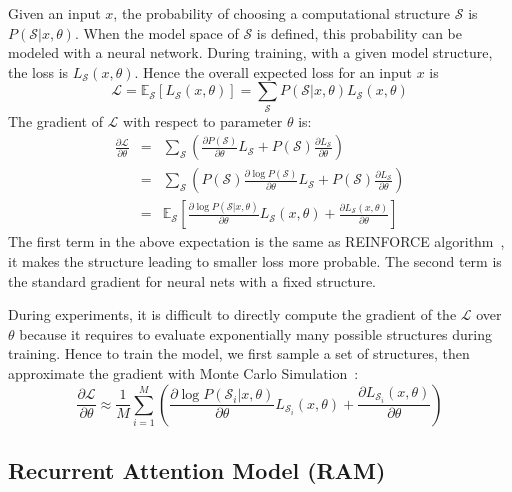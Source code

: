 \documentclass[10pt,twocolumn,letterpaper]{article}
\newcommand{\pian}[2]{\frac{\partial #1}{\partial #2}}
\begin{document}
Given an input $x$, the probability of choosing a computational structure $\mathcal{S}$ is $P(\mathcal{S}|x, \theta)$.
When the model space of $\mathcal{S}$ is defined, this probability can be modeled with a neural network.
During training, with a given model structure, the loss is $L_\mathcal{S}(x, \theta)$.
Hence the overall expected loss for an input $x$ is
\begin{equation}
\mathcal{L} = \mathbb{E}_\mathcal{S} \left[L_\mathcal{S}(x, \theta)\right] = \sum_{\mathcal{S}} P(\mathcal{S}|x, \theta) L_\mathcal{S}(x, \theta)
\label{eq:loss}
\end{equation}
The gradient of $\mathcal{L}$ with respect to parameter $\theta$ is:
\begin{eqnarray*}
\pian{\mathcal{L}}{\theta} &=& \sum_{\mathcal{S}} \left(\pian{P(\mathcal{S})}{\theta} L_\mathcal{S} + P(\mathcal{S}) \pian{L_\mathcal{S}}{\theta}\right) \\
&=& \sum_{\mathcal{S}} \left(P(\mathcal{S}) \pian{\log P(\mathcal{S})}{\theta} L_\mathcal{S} + P(\mathcal{S}) \pian{L_\mathcal{S}}{\theta}\right) \\
&=& \mathbb{E}_\mathcal{S}\left[\pian{\log P(\mathcal{S}|x, \theta)}{\theta} L_\mathcal{S}(x, \theta) + \pian{L_\mathcal{S}(x, \theta)}{\theta}\right]
\end{eqnarray*}
The first term in the above expectation is the same as REINFORCE algorithm~\cite{sutton1999policy}, it makes the structure leading to smaller loss more probable. The second term is the standard gradient for neural nets with a fixed structure.

During experiments, it is difficult to directly compute the gradient of the $\mathcal{L}$ over $\theta$ because it requires to evaluate exponentially many possible structures during training.
Hence to train the model, we first sample a set of structures, then approximate the gradient with Monte Carlo Simulation~\cite{sutton1999policy}:
\begin{equation}
\pian{\mathcal{L}}{\theta} \approx \frac{1}{M} \sum_{i=1}^M \left( \pian{\log P(\mathcal{S}_i|x, \theta)}{\theta} L_{\mathcal{S}_i}(x, \theta) + \pian{L_{\mathcal{S}_i}(x, \theta)}{\theta} \right)
\label{eq:train}
\end{equation}

\subsection{Recurrent Attention Model (RAM)}
\end{document}
